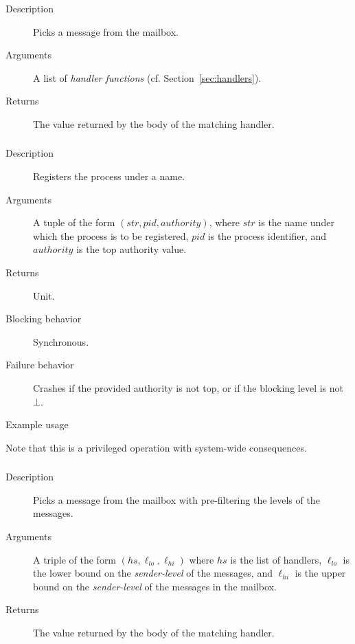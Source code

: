 \subsubsection{}
\begin{description}
    \item [Description] Picks a message from the mailbox.
    \item [Arguments] A list of \emph{handler functions} (cf. Section~\ref{sec:handlers}).
    \item [Returns] The value returned by the body of the matching handler.
\end{description}

\subsubsection{}
\begin{description}
    \item [Description] Registers the process under a name.
    \item [Arguments] A tuple of the form $(\mathit{str}, \mathit{pid}, \mathit{authority})$, where $\mathit{str}$ is the name under
which the process is to be registered, $\mathit{pid}$ is the process identifier, and 
$\mathit{authority}$ is the top authority value.
    \item [Returns] Unit.
    \item [Blocking behavior] Synchronous. 
    \item [Failure behavior] Crashes if the provided authority is not top, or if the blocking level is not $\bot$.
    \item [Example usage]
\end{description}

Note that this is a privileged operation with system-wide consequences. 


\subsubsection{}
\begin{description}
    \item [Description] Picks a message from the mailbox with pre-filtering the levels of the messages.
    \item [Arguments] A triple of the form $(\mathit{hs}, \ell_{\mathit{lo}}, \ell_{\mathit{hi}}) $ where $\mathit{hs}$ is the list of handlers, $\ell_{\mathit{lo}}$ is the lower bound on the \emph{sender-level} of the messages, and 
$\ell_{\mathit{hi}}$ is the upper bound on the \emph{sender-level} of the messages in the mailbox.
    \item [Returns] The value returned by the body of the matching handler.
\end{description}


